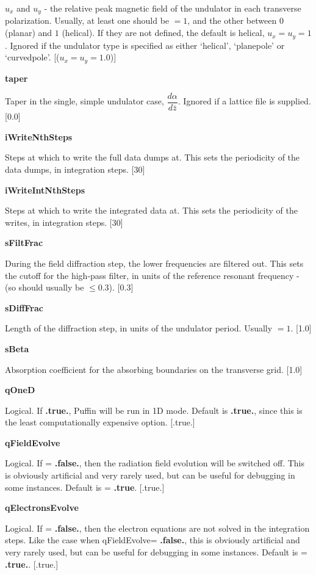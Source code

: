\documentclass[12pt]{article}%
\begin{document}
$u_x$ and $u_y$ - the relative peak magnetic field of the undulator in each transverse polarization. Usually, at least one should be $=1$, and the other between $0$ (planar) and $1$ (helical). If they are not defined, the default is helical, $u_x=u_y=1$. Ignored if the undulator type is specified as either `helical', `planepole' or `curvedpole'. [($u_x = u_y = 1.0$)]

{\bf taper}

Taper in the single, simple undulator case, $\dfrac{d\alpha}{d \bar{z}}$. Ignored if a lattice file is supplied. [$0.0$]

{\bf iWriteNthSteps}

Steps at which to write the full data dumps at. This sets the periodicity of the data dumps, in integration steps. [$30$]

{\bf iWriteIntNthSteps}

Steps at which to write the integrated data at. This sets the periodicity of the writes, in integration steps. [$30$]

{\bf sFiltFrac}

During the field diffraction step, the lower frequencies are filtered out. This sets the cutoff for the high-pass filter, in units of the reference resonant frequency - (so should usually be $\leq 0.3$). [0.3]

{\bf sDiffFrac}

Length of the diffraction step, in units of the undulator period. Usually $=1$. [1.0]

{\bf sBeta}

Absorption coefficient for the absorbing boundaries on the transverse grid. [1.0]

{\bf qOneD}

Logical. If  {\bf .true.}, Puffin will be run in 1D mode. Default is  {\bf .true.}, since this is the least computationally expensive option. [.true.]

{\bf qFieldEvolve}

Logical. If = {\bf .false.}, then the radiation field evolution will be switched off. This is obviously artificial and very rarely used, but can be useful for debugging in some instances. Default is = {\bf .true}. [.true.]

{\bf qElectronsEvolve}

Logical. If = {\bf .false.}, then the electron equations are not solved in the integration steps. Like the case when qFieldEvolve= {\bf .false.},  this is obviously artificial and very rarely used, but can be useful for debugging in some instances. Default is = {\bf .true.}. [.true.]
\end{document}
